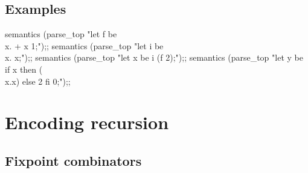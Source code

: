 \section{Examples}


\begin{caml_example}
semantics (parse_top "let f be \\x. + x 1;");;
semantics (parse_top "let i be \\x. x;");;
semantics (parse_top "let x be i (f 2);");;
semantics (parse_top "let y be if x then (\\x.x) else 2 fi 0;");;
\end{caml_example}

\chapter{Encoding recursion}
\label{c:ASLuntypedrecursion}

\section{Fixpoint combinators}

